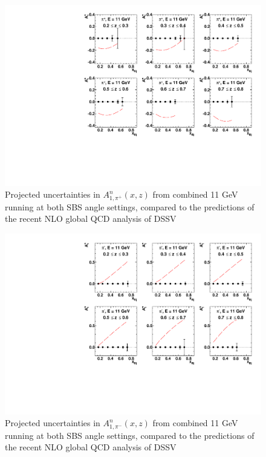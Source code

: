 \begin{figure}[h]
  \begin{center}
    \includegraphics[width=.75\textwidth]{figures/A1n_vs_x_E11_pip.pdf}
  \end{center}
  \caption{\label{A1n_pip_11gev} Projected uncertainties in $A_{1,\pi^+}^{n}(x,z)$ from combined 11 GeV running at both SBS angle settings, compared to the predictions of the recent NLO global QCD analysis of DSSV~\cite{DSSVplus}}
\end{figure}

\begin{figure}[h]
  \begin{center}
    \includegraphics[width=.75\textwidth]{figures/A1n_vs_x_E11_pim.pdf}
  \end{center}
  \caption{\label{A1n_pim_11gev} Projected uncertainties in $A_{1,\pi^-}^{n}(x,z)$ from combined 11 GeV running at both SBS angle settings, compared to the predictions of the recent NLO global QCD analysis of DSSV~\cite{DSSVplus}}
\end{figure}


